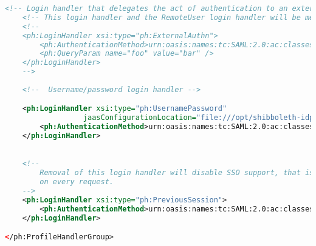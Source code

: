 \begin{lstlisting}[language=xml]
    <!-- Login handler that delegates the act of authentication to an external system. -->
    <!-- This login handler and the RemoteUser login handler will be merged in the next major release. -->
    <!--
    <ph:LoginHandler xsi:type="ph:ExternalAuthn">
        <ph:AuthenticationMethod>urn:oasis:names:tc:SAML:2.0:ac:classes:unspecified</ph:AuthenticationMethod>
        <ph:QueryParam name="foo" value="bar" />
    </ph:LoginHandler>
    -->
    
    <!--  Username/password login handler -->

    <ph:LoginHandler xsi:type="ph:UsernamePassword" 
                  jaasConfigurationLocation="file:///opt/shibboleth-idp/conf/login.config">
        <ph:AuthenticationMethod>urn:oasis:names:tc:SAML:2.0:ac:classes:PasswordProtectedTransport</ph:AuthenticationMethod>
    </ph:LoginHandler>

    
    <!-- 
        Removal of this login handler will disable SSO support, that is it will require the user to authenticate 
        on every request.
    -->
    <ph:LoginHandler xsi:type="ph:PreviousSession">
        <ph:AuthenticationMethod>urn:oasis:names:tc:SAML:2.0:ac:classes:PreviousSession</ph:AuthenticationMethod>
    </ph:LoginHandler>

</ph:ProfileHandlerGroup>
\end{lstlisting}

